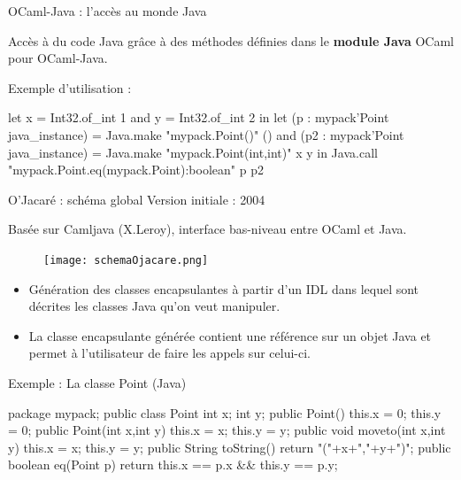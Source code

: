 \documentclass[xcolor={table,dvipsnames}]{beamer}
\begin{document}
\begin{frame}[fragile]{OCaml-Java : l'accès au monde Java}

  Accès à du code Java grâce à des méthodes définies dans le
  \textbf{module Java} OCaml pour OCaml-Java.

\bigskip

Exemple d'utilisation :

\begin{OCamlEx}
let x = Int32.of_int 1
and y = Int32.of_int 2 in
let (p : mypack'Point java_instance) = 
   Java.make "mypack.Point()" ()
and (p2 : mypack'Point java_instance) = 
   Java.make "mypack.Point(int,int)" x y 
in
   Java.call "mypack.Point.eq(mypack.Point):boolean" p p2
\end{OCamlEx}



\end{frame}








\begin{frame}{O'Jacaré : schéma global }
Version initiale : 2004

Basée sur Camljava (X.Leroy), interface bas-niveau entre OCaml et Java.
\medskip
\begin{figure}[h]
  \centering
  \texttt{[image: schemaOjacare.png]}
\end{figure}
\begin{itemize}
\item
Génération des classes encapsulantes à partir d'un IDL dans lequel sont décrites les classes Java qu'on veut manipuler.
\item
     La \alert{classe encapsulante} générée contient une référence sur un objet Java et permet à l'utilisateur de faire les appels sur celui-ci.
\end{itemize}

\end{frame}







\begin{frame}[fragile]{Exemple : La classe Point (Java)}
\bigskip

\begin{javaEx} 
  package mypack;
  public class Point {
    int x;
    int y;
    public Point() { 
      this.x = 0;
      this.y = 0;
    }
    public Point(int x,int y) {
      this.x = x;
      this.y = y;
    }
    public void moveto(int x,int y){
      this.x = x;
      this.y = y;
    }
    public String toString() {
      return "("+x+","+y+")";
    }
    public boolean eq(Point p) {
      return this.x == p.x  && this.y == p.y;
    }
  }
\end{javaEx}

\end{frame}
\end{document}
